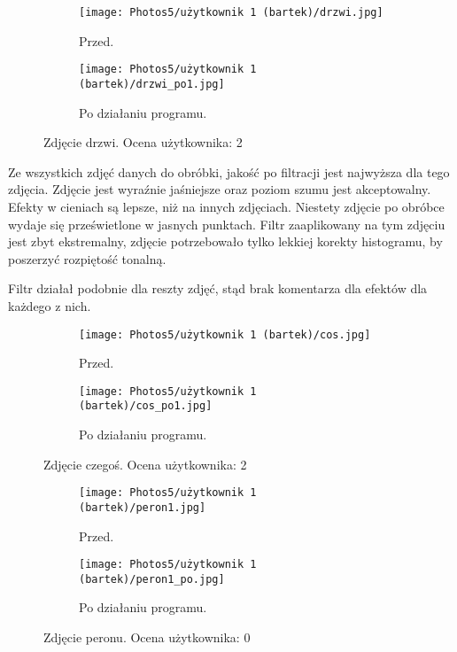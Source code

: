 \documentclass[]{mwart}
\begin{document}
\begin{figure}[h!]
    \centering
    \begin{subfigure}[b]{0.49\textwidth}
        \centering
        \texttt{[image: Photos5/użytkownik 1 (bartek)/drzwi.jpg]}
        \caption{Przed.}
    \end{subfigure}
    \hfill
    \begin{subfigure}[b]{0.49\textwidth}
        \centering
        \texttt{[image: Photos5/użytkownik 1 (bartek)/drzwi\_po1.jpg]}
        \caption{Po działaniu programu.}
    \end{subfigure}
    \caption{Zdjęcie drzwi. Ocena użytkownika:  2  }
\end{figure}
Ze wszystkich zdjęć danych do obróbki, jakość po filtracji jest najwyższa dla tego zdjęcia. Zdjęcie jest wyraźnie jaśniejsze oraz poziom szumu jest akceptowalny. Efekty w cieniach są lepsze, niż na innych zdjęciach. Niestety zdjęcie po obróbce wydaje się prześwietlone w jasnych punktach. Filtr zaaplikowany na tym zdjęciu jest zbyt ekstremalny, zdjęcie potrzebowało tylko lekkiej korekty histogramu, by poszerzyć rozpiętość tonalną. \newline

Filtr działał podobnie dla reszty zdjęć, stąd brak komentarza dla efektów dla każdego z nich.
\newpage




\begin{figure}[h!]
    \centering
    \begin{subfigure}[b]{0.49\textwidth}
        \centering
        \texttt{[image: Photos5/użytkownik 1 (bartek)/cos.jpg]}
        \caption{Przed.}
    \end{subfigure}
    \hfill
    \begin{subfigure}[b]{0.49\textwidth}
        \centering
        \texttt{[image: Photos5/użytkownik 1 (bartek)/cos\_po1.jpg]}
        \caption{Po działaniu programu.}
    \end{subfigure}
    \caption{Zdjęcie czegoś. Ocena użytkownika: 2    }
\end{figure}

\begin{figure}[h!]
    \centering
    \begin{subfigure}[b]{0.49\textwidth}
        \centering
        \texttt{[image: Photos5/użytkownik 1 (bartek)/peron1.jpg]}
        \caption{Przed.}
    \end{subfigure}
    \hfill
    \begin{subfigure}[b]{0.49\textwidth}
        \centering
        \texttt{[image: Photos5/użytkownik 1 (bartek)/peron1\_po.jpg]}
        \caption{Po działaniu programu.}
    \end{subfigure}
    \caption{Zdjęcie peronu. Ocena użytkownika: 0   }
\end{figure}
\end{document}
